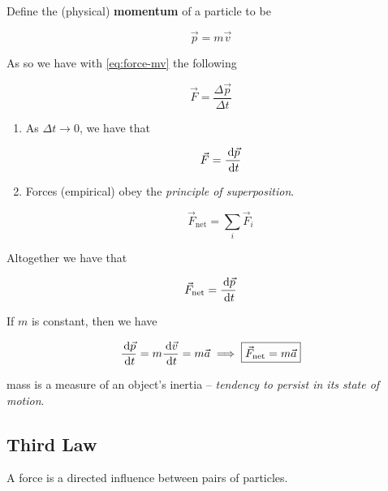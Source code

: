 \begin{definition}
	Define the (physical) \textbf{momentum} of a particle to be

	\begin{equation}
		\vec p = m \vec v
	\end{equation}
\end{definition}

As so we have with \cref*{eq:force-mv} the following

\begin{equation}
	\vec F = \frac{\Delta \vec p}{\Delta t}
\end{equation}

\begin{enumerate}
	\item As $\Delta t \to 0$, we have that
	
	\begin{equation}
		\vec F = \frac{\D \vec p}{\D t}
	\end{equation}

	\item Forces (empirical) obey the \textit{principle of superposition}.

	\begin{equation}
		\vec F_\mathrm{net} = \sum_i \vec F_i
	\end{equation}
\end{enumerate}

Altogether we have that

\begin{equation}
	\vec F_\mathrm{net} = \frac{\D \vec p}{\D t}
\end{equation}

If $m$ is constant, then we have

\begin{equation}
	\frac{\D \vec p}{\D t} = m \frac{\D \vec v}{\D t} = m \vec a \implies \boxed{\vec F_\mathrm{net} = m \vec a}
\end{equation}

mass is a measure of an object's inertia -- \textit{tendency to persist in its state of motion}.

\subsection{Third Law}

\begin{definition}
	A force is a directed influence between pairs of particles.
\end{definition}


